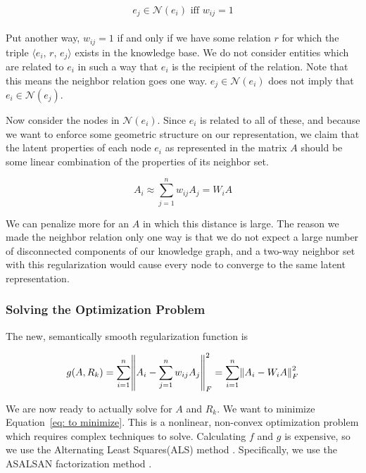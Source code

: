 \documentclass[pageno]{final_paper}
\begin{document}
\begin{equation}
    \label{eq: new neighbor set}
    e_j \in \mathcal{N}(e_i) \text{ iff } w_{ij} = 1
\end{equation} \\

Put another way, $w_{ij} = 1$ if and only if we have some relation $r$ for which
the triple $\langle e_i,\,r,\,e_j \rangle$ exists in the knowledge base. We do
not consider entities which are related to $e_i$ in such a way that $e_i$ is the
recipient of the relation. Note that this means the neighbor relation goes one
way. $e_j \in \mathcal{N}(e_i)$ does not imply that $e_i \in \mathcal{N}(e_j)$.

Now consider the nodes in $\mathcal{N}(e_i)$. Since $e_i$ is related to all of
these, and because we want to enforce some geometric structure on our
representation, we claim that the latent properties of each node $e_i$ as
represented in the matrix $A$ should be some linear combination of the
properties of its neighbor set.

$$ A_i \approx \sum_{j=1}^n w_{ij}A_j = W_iA$$

We can penalize more for an $A$ in which this distance is large. The reason we
made the neighbor relation only one way is that we do not expect a large number
of disconnected components of our knowledge graph, and a two-way neighbor set
with this regularization would cause every node to converge to the same latent
representation.

\subsubsection{Solving the Optimization Problem}
\label{Solving the Optimization Problem}

The new, semantically smooth regularization function is

\begin{equation}
    \label{eq: new g}
    g(A, R_k) = \sum_{i=1}^n \norm{A_i - \sum_{j=1}^n w_{ij}A_j}_F^2 =
    \sum_{i=1}^n \norm{A_i - W_iA}_F^2
\end{equation}

We are now ready to actually solve for $A$ and $R_k$. We want to minimize
Equation~\eqref{eq: to minimize}. This is a nonlinear, non-convex optimization
problem which requires complex techniques to solve. Calculating $f$ and $g$ is
expensive, so we use the Alternating Least Squares(ALS) method \cite{Koren2009}.
Specifically, we use the ASALSAN factorization method \cite{Bader2007}. \\
\end{document}
